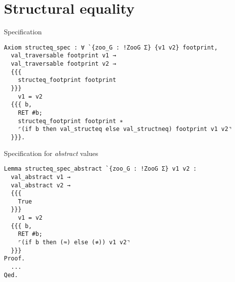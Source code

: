 \section{Structural equality}

\begin{frame}[fragile]{Specification}
\large
\begin{verbatim}
Axiom structeq_spec : ∀ `{zoo_G : !ZooG Σ} {v1 v2} footprint,
  val_traversable footprint v1 →
  val_traversable footprint v2 →
  {{{
    structeq_footprint footprint
  }}}
    v1 = v2
  {{{ b,
    RET #b;
    structeq_footprint footprint ∗
    ⌜(if b then val_structeq else val_structneq) footprint v1 v2⌝
  }}}.
\end{verbatim}
\end{frame}

\begin{frame}[fragile]{Specification for \emph{abstract} values}
\large
\begin{verbatim}
Lemma structeq_spec_abstract `{zoo_G : !ZooG Σ} v1 v2 :
  val_abstract v1 →
  val_abstract v2 →
  {{{
    True
  }}}
    v1 = v2
  {{{ b,
    RET #b;
    ⌜(if b then (≈) else (≉)) v1 v2⌝
  }}}
Proof.
  ...
Qed.
\end{verbatim}
\end{frame}